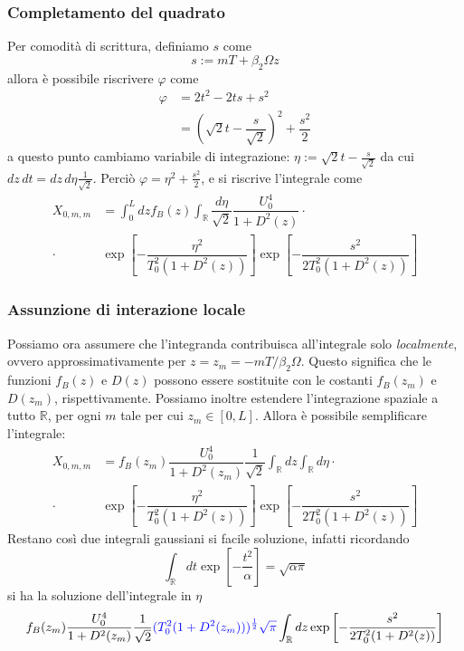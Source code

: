 \documentclass[8pt]{beamer} %
\begin{document}
\begin{frame}
    \frametitle{Completamento del quadrato}
    Per comodità di scrittura, definiamo $s$ come
    \begin{equation*}
        s := mT+\beta_2\Omega z
    \end{equation*}
    allora è possibile riscrivere $\varphi$ come
    \begin{align*}
        \varphi & = 2t^2 - 2ts + s^2                                                \\
                & = \left(\sqrt{2}t - \dfrac{s}{\sqrt{2}}\right)^2 + \dfrac{s^2}{2}
    \end{align*}
    a questo punto cambiamo variabile di integrazione: $\eta := \sqrt{2}t - \frac{s}{\sqrt{2}}$
    da cui $dz\,dt = dz\,d\eta \frac{1}{\sqrt{2}}$.
    Perciò $\varphi = \eta^2 + \frac{s^2}{2}$, e si riscrive l'integrale come
    \begin{align*}
        X_{0, m, m} & = \int_{0}^{L}dz f_B(z) \int_{\mathbb{R}}\dfrac{d\eta}{\sqrt{2}}
        \dfrac{U_0^4}{1+D^2(z)} \cdot                                                  \\ \cdot  &\exp\left[-\dfrac{\eta^2}{T_0^2(1+D^2(z))} \right] \exp\left[-\dfrac{s^2}{2T_0^2(1+D^2(z))} \right]
    \end{align*}
\end{frame}

\begin{frame}
    \frametitle{Assunzione di interazione locale}
    Possiamo ora assumere che l'integranda contribuisca all'integrale solo \emph{localmente}, ovvero approssimativamente per $z=z_m=-mT/\beta_2\Omega$. Questo significa che le funzioni $f_B(z)$ e $D(z)$ possono essere sostituite con le costanti $f_B(z_m)$ e $D(z_m)$, rispettivamente. Possiamo inoltre estendere l'integrazione spaziale a tutto $\mathbb{R}$, per ogni $m$ tale per cui $z_m \in [0, L]$.
    Allora è possibile semplificare l'integrale:
    \begin{align*}
        X_{0, m, m} & = f_B(z_m) \dfrac{U_0^4}{1+D^2(z_m)}  \dfrac{1}{\sqrt{2}}\int_{\mathbb{R}}dz \int_{\mathbb{R}}d\eta
        \cdot                                                                                                             \\ \cdot  &\exp\left[-\dfrac{\eta^2}{T_0^2(1+D^2(z))} \right] \exp\left[-\dfrac{s^2}{2T_0^2(1+D^2(z))} \right]
    \end{align*}
    Restano così due integrali gaussiani si facile soluzione, infatti ricordando
    \begin{equation}
        \int_{\mathbb{R}}dt \exp\left[-\dfrac{t^2}{\alpha}\right] = \sqrt{\alpha \pi}
    \end{equation}
    si ha la soluzione dell'integrale in $\eta$
    \begin{equation}
        f_B(z_m) \dfrac{U_0^4}{1+D^2(z_m)}  \dfrac{1}{\sqrt{2}}  {\color{blue}(T_0^2(1+D^2(z_m)))^{\frac{1}{2}}\sqrt{\pi}} \int_{\mathbb{R}}dz   \exp\left[-\dfrac{s^2}{2T_0^2(1+D^2(z))} \right]
    \end{equation}

\end{frame}
\end{document}
